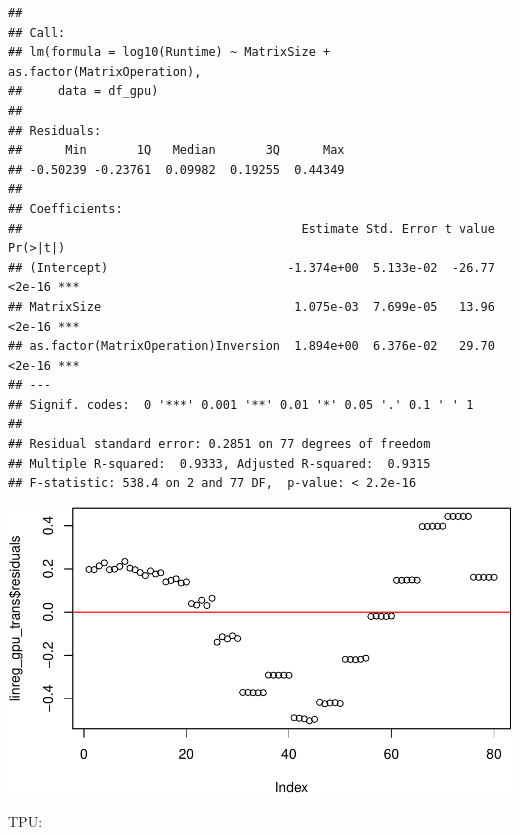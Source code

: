 \documentclass[
]{article}
\newenvironment{Shaded}{\begin{snugshade}}{\end{snugshade}}
\newcommand{\DataTypeTok}[1]{\textcolor[rgb]{0.13,0.29,0.53}{#1}}
\newcommand{\DecValTok}[1]{\textcolor[rgb]{0.00,0.00,0.81}{#1}}
\newcommand{\KeywordTok}[1]{\textcolor[rgb]{0.13,0.29,0.53}{\textbf{#1}}}
\newcommand{\NormalTok}[1]{#1}
\newcommand{\OperatorTok}[1]{\textcolor[rgb]{0.81,0.36,0.00}{\textbf{#1}}}
\newcommand{\StringTok}[1]{\textcolor[rgb]{0.31,0.60,0.02}{#1}}
\begin{document}
\begin{verbatim}
## 
## Call:
## lm(formula = log10(Runtime) ~ MatrixSize + as.factor(MatrixOperation), 
##     data = df_gpu)
## 
## Residuals:
##      Min       1Q   Median       3Q      Max 
## -0.50239 -0.23761  0.09982  0.19255  0.44349 
## 
## Coefficients:
##                                       Estimate Std. Error t value Pr(>|t|)    
## (Intercept)                         -1.374e+00  5.133e-02  -26.77   <2e-16 ***
## MatrixSize                           1.075e-03  7.699e-05   13.96   <2e-16 ***
## as.factor(MatrixOperation)Inversion  1.894e+00  6.376e-02   29.70   <2e-16 ***
## ---
## Signif. codes:  0 '***' 0.001 '**' 0.01 '*' 0.05 '.' 0.1 ' ' 1
## 
## Residual standard error: 0.2851 on 77 degrees of freedom
## Multiple R-squared:  0.9333, Adjusted R-squared:  0.9315 
## F-statistic: 538.4 on 2 and 77 DF,  p-value: < 2.2e-16
\end{verbatim}

\begin{Shaded}
\end{Shaded}

\includegraphics{main_files/figure-latex/unnamed-chunk-12-3.pdf}

TPU:

\begin{Shaded}
\end{Shaded}
\end{document}
